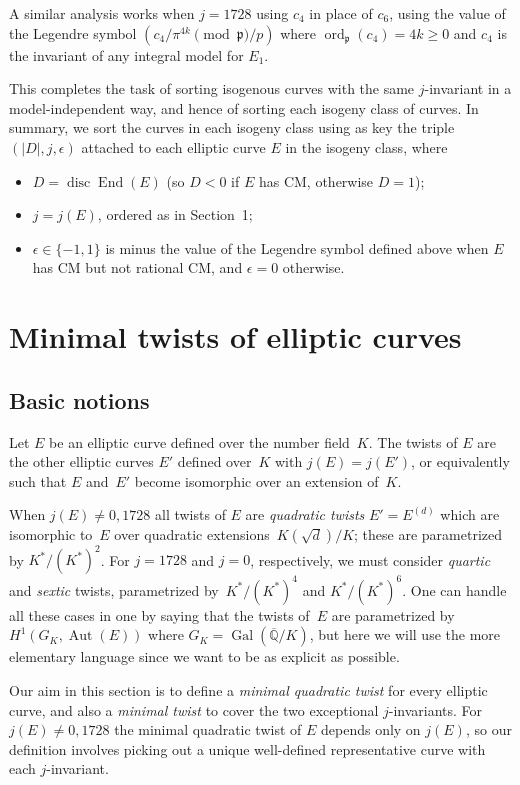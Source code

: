 \documentclass{article}
\def\Q{{\mathbb Q}}
\def\p{{\mathfrak p}}
\def\Qbar{\overline{\Q}}
\DeclareMathOperator{\disc}{disc}
\DeclareMathOperator{\ord}{ord}
\DeclareMathOperator{\Gal}{Gal}
\DeclareMathOperator{\End}{End}
\DeclareMathOperator{\Aut}{Aut}
\begin{document}
A similar analysis works when $j=1728$ using $c_4$ in place of $c_6$,
using the value of the Legendre symbol $(c_4/\pi^{4k}\pmod{\p}/p)$
where $\ord_{\p}(c_4)=4k\ge0$ and $c_4$ is the invariant of any
integral model for $E_1$.

This completes the task of sorting isogenous curves with the same
$j$-invariant in a model-independent way, and hence of sorting each
isogeny class of curves.  In summary, we sort the curves in each
isogeny class using as key the triple $(|D|,j,\epsilon)$ attached to
each elliptic curve $E$ in the isogeny class, where
\begin{itemize}
\item $D=\disc\End(E)$ (so $D<0$ if $E$ has CM, otherwise $D=1$);
\item $j=j(E)$, ordered as in Section~1;
\item $\epsilon\in\{-1,1\}$ is minus the value of the Legendre symbol
  defined above when $E$ has CM but not rational CM, and $\epsilon=0$
  otherwise.
\end{itemize}

\section{Minimal twists of elliptic curves}

\subsection{Basic notions}
Let $E$ be an elliptic curve defined over the number field~$K$.  The
twists of $E$ are the other elliptic curves $E'$ defined over~$K$ with
$j(E)=j(E')$, or equivalently such that $E$ and~$E'$ become isomorphic
over an extension of~$K$.

When $j(E)\not=0,1728$ all twists of $E$ are \textit{quadratic twists}
$E'=E^{(d)}$ which are isomorphic to~$E$ over quadratic
extensions~$K(\sqrt{d})/K$; these are parametrized by $K^*/(K^*)^2$.
For $j=1728$ and $j=0$, respectively, we must consider
\textit{quartic} and \textit{sextic} twists, parametrized
by~$K^*/(K^*)^4$ and $K^*/(K^*)^6$.  One can handle all these cases in
one by saying that the twists of~$E$ are parametrized by
$H^1(G_K,\Aut(E))$ where $G_K=\Gal(\Qbar/K)$, but here we will use the
more elementary language since we want to be as explicit as possible.

Our aim in this section is to define a \textit{minimal quadratic
  twist} for every elliptic curve, and also a \textit{minimal twist}
to cover the two exceptional $j$-invariants.  For $j(E)\not=0,1728$
the minimal quadratic twist of $E$ depends only on $j(E)$, so our
definition involves picking out a unique well-defined representative
curve with each $j$-invariant.
\end{document}
